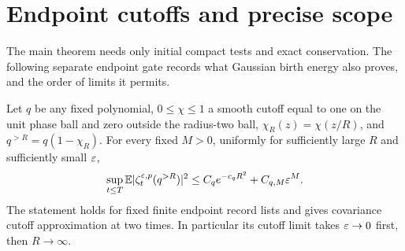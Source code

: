 \section{Endpoint cutoffs and precise scope}\label{sec:scope}
The main theorem needs only initial compact tests and exact conservation.
The following separate endpoint gate records what Gaussian birth energy
also proves, and the order of limits it permits.

\begin{lemma}
\label{lem:endpoint}
Let $q$ be any fixed polynomial, $0\le\chi\le1$ a smooth cutoff equal
to one on the unit phase ball and zero outside the radius-two ball,
$\chi_R(z)=\chi(z/R)$, and $q^{>R}=q(1-\chi_R)$. For every fixed
$M>0$, uniformly for sufficiently large $R$ and sufficiently small $\varepsilon$,
\begin{equation}\label{eq:endpoint-tail}
 \sup_{t\le T}\mathbb E|\zeta_t^{\varepsilon,p}(q^{>R})|^2
        \le C_qe^{-c_qR^2}+C_{q,M}\varepsilon^M.
\end{equation}
The statement holds for fixed finite endpoint record lists and gives
covariance cutoff approximation at two times. In particular its cutoff
limit takes $\varepsilon\to0$ first, then $R\to\infty$.
\end{lemma}
